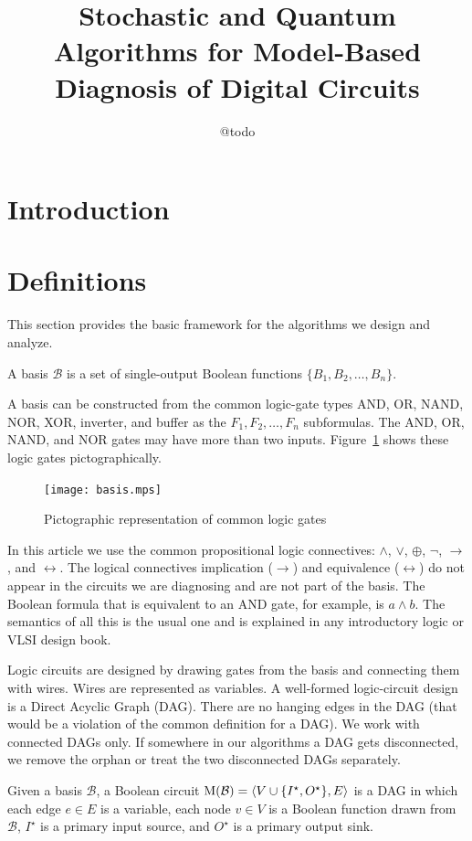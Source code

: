 \documentclass{article}
\title{Stochastic and Quantum Algorithms for Model-Based Diagnosis of Digital Circuits}
\author{@todo}
\begin{document}
\maketitle
\section{Introduction}

\section{Definitions}
%
This section provides the basic framework for the algorithms we design
and analyze.
%
\begin{definition}[Basis]
  A basis $\mathcal{B}$ is a set of single-output Boolean functions
  $\{B_1, B_2, \ldots, B_n\}$.
\end{definition}
%
A basis can be constructed from the common logic-gate types AND, OR,
NAND, NOR, XOR, inverter, and buffer as the $F_1, F_2, \ldots, F_n$
subformulas. The AND, OR, NAND, and NOR gates may have more than two
inputs. Figure~\ref{fig:basis} shows these logic gates
pictographically.
%
\begin{figure}[htb]
\centering \texttt{[image: basis.mps]}
\caption{Pictographic representation of common logic
  gates\label{fig:basis}}
\end{figure}
\par
%
In this article we use the common propositional logic connectives:
$\wedge$, $\vee$, $\oplus$, $\neg$, $\rightarrow$, and
$\leftrightarrow$. The logical connectives implication ($\rightarrow$)
and equivalence ($\leftrightarrow$) do not appear in the circuits we
are diagnosing and are not part of the basis. The Boolean formula that
is equivalent to an AND gate, for example, is $a \wedge b$. The
semantics of all this is the usual one and is explained in any
introductory logic or VLSI design book.
\par
Logic circuits are designed by drawing gates from the basis and
connecting them with wires. Wires are represented as variables. A
well-formed logic-circuit design is a Direct Acyclic Graph
(DAG). There are no hanging edges in the DAG (that would be a
violation of the common definition for a DAG). We work with connected
DAGs only. If somewhere in our algorithms a DAG gets disconnected, we
remove the orphan or treat the two disconnected DAGs separately.
%
\begin{definition}
  Given a basis $\mathcal{B}$, a Boolean circuit $\mathrm{M}(\mathcal{B})
  = \langle{V \cup \{I^\star, O^\star\}, E}\rangle$ is a DAG in which
  each edge $e \in E$ is a variable, each node $v \in V$ is a Boolean
  function drawn from $\mathcal{B}$, $I^\star$ is a primary input
  source, and $O^\star$ is a primary output sink.
\end{definition}
\end{document}
